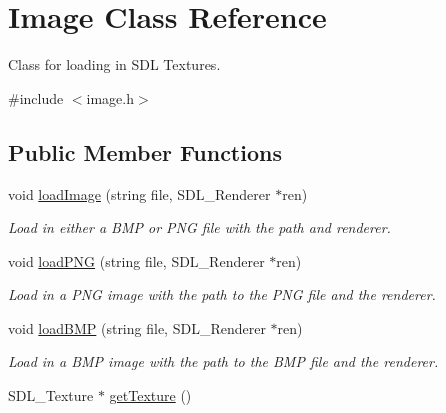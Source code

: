 \hypertarget{classImage}{}\section{Image Class Reference}
\label{classImage}


Class for loading in S\+DL Textures.  




{\ttfamily \#include $<$image.\+h$>$}

\subsection*{Public Member Functions}
\begin{DoxyCompactItemize}
\item 
\mbox{\label{classImage_a776ab55f3884f994512aa092cd7fa250}} 
void \hyperlink{classImage_a776ab55f3884f994512aa092cd7fa250}{load\+Image} (string file, S\+D\+L\+\_\+\+Renderer $\ast$ren)
\begin{DoxyCompactList}\small\item\em Load in either a B\+MP or P\+NG file with the path and renderer. \end{DoxyCompactList}\item 
\mbox{\label{classImage_ab00c4a53e3154287075c956c805e1cb1}} 
void \hyperlink{classImage_ab00c4a53e3154287075c956c805e1cb1}{load\+P\+NG} (string file, S\+D\+L\+\_\+\+Renderer $\ast$ren)
\begin{DoxyCompactList}\small\item\em Load in a P\+NG image with the path to the P\+NG file and the renderer. \end{DoxyCompactList}\item 
\mbox{\label{classImage_ad37ad8bd7d9572be7fbbd921a299d235}} 
void \hyperlink{classImage_ad37ad8bd7d9572be7fbbd921a299d235}{load\+B\+MP} (string file, S\+D\+L\+\_\+\+Renderer $\ast$ren)
\begin{DoxyCompactList}\small\item\em Load in a B\+MP image with the path to the B\+MP file and the renderer. \end{DoxyCompactList}\item 
\mbox{\label{classImage_a6312e473b9315c6db49fbd284b5cf81a}} 
S\+D\+L\+\_\+\+Texture $\ast$ \hyperlink{classImage_a6312e473b9315c6db49fbd284b5cf81a}{get\+Texture} ()

\end{DoxyCompactItemize}
